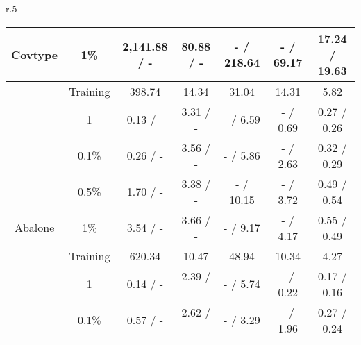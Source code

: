 \begin{wraptable}[23]{r}{.5\textwidth}
{\begin{tabular}{ccccccc}
\multirow{-5}{*}{Covtype}                            & 1\%                             & 2,141.88 / -                                                        & 80.88 / -                                                        & - / 218.64                                                            & - / 69.17                                                             & 17.24 / 19.63                      \\\midrule
{}                              & {Training} & {398.74}                                       & {14.34}                                     & {31.04}                                          & {14.31}                                          & {5.82}        \\
{}                              & {1}        & {0.13 / -}                                     & {3.31 / -}                                  & {- / 6.59}                                       & {- / 0.69}                                       & {0.27 / 0.26} \\
{}                              & {0.1\%}    & {0.26 / -}                                     & {3.56 / -}                                  & {- / 5.86}                                       & {- / 2.63}                                       & {0.32 / 0.29} \\
{}                              & {0.5\%}    & {1.70 / -}                                     & {3.38 / -}                                  & {- / 10.15}                                      & {- / 3.72}                                       & {0.49 / 0.54} \\
\multirow{-5}{*}{{Abalone}}     & {1\%}      & {3.54 / -}                                     & {3.66 / -}                                  & {- / 9.17}                                       & {- / 4.17}                                       & {0.55 / 0.49} \\\midrule
{}                              & {Training} & {620.34}                                   & {10.47}                                     & {48.94}                                          & {10.34}                                          & {4.27}        \\
{}                              & {1}        & {0.14 / -}                                     & {2.39 / -}                                  & {- / 5.74}                                       & {- / 0.22}                                       & {0.17 / 0.16} \\
{}                              & {0.1\%}    & {0.57 / -}                                     & {2.62 / -}                                  & {- / 3.29}                                       & {- / 1.96}                                       & {0.27 / 0.24} \\

\end{tabular}}
\end{wraptable}
